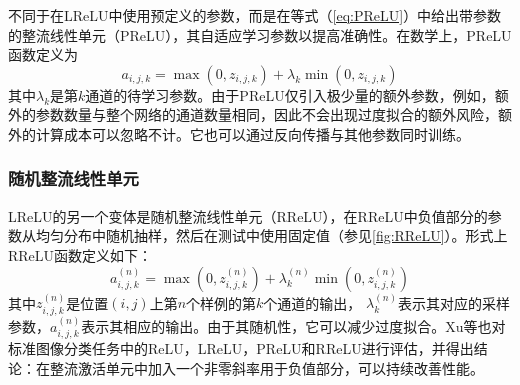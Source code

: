 不同于在LReLU中使用预定义的参数，而是在等式（\ref{eq:PReLU}）中给出带参数的整流线性单元（PReLU），其自适应学习参数以提高准确性。在数学上，PReLU函数定义为
\begin{equation}\label{eq:PReLU}
    a_{i,j,k}=\max(0,z_{i,j,k})+\lambda_k\min(0,z_{i,j,k})
\end{equation}
其中$ \lambda_k $是第$ k $通道的待学习参数。由于PReLU仅引入极少量的额外参数，例如，额外的参数数量与整个网络的通道数量相同，因此不会出现过度拟合的额外风险，额外的计算成本可以忽略不计。它也可以通过反向传播与其他参数同时训练。

\subsubsection{随机整流线性单元}\label{RReLU_comp}
LReLU的另一个变体是随机整流线性单元（RReLU）\cite{xu2015ecirical}，在RReLU中负值部分的参数从均匀分布中随机抽样，然后在测试中使用固定值（参见\figurename {\ref{fig:RReLU}}）。形式上RReLU函数定义如下：
\begin{equation}\label{eq:RReLU}
    a^{(n)}_{i,j,k}=\max(0,z^{(n)}_{i,j,k})+\lambda^{(n)}_k\min(0,z^{(n)}_{i,j,k})
\end{equation}
其中$ z^{(n)}_{i,j,k}$是位置$ (i,j) $上第$n$个样例的第$k$个通道的输出， $ \lambda^{(n)}_k $表示其对应的采样参数，$a^{(n)}_{i,j,k}$表示其相应的输出。由于其随机性，它可以减少过度拟合。Xu等\cite{xu2015ecirical}也对标准图像分类任务中的ReLU，LReLU，PReLU和RReLU进行评估，并得出结论：在整流激活单元中加入一个非零斜率用于负值部分，可以持续改善性能。

